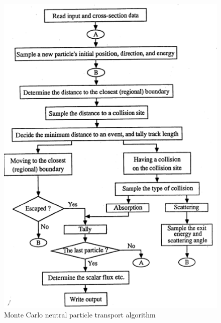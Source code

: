 \documentclass[12pt]{article}
\begin{document}
\begin{figure}[h!]
\begin{center}
  \includegraphics[height=6 in,clip]{../figs/MC-algorithm}
\end{center}
  \caption{Monte Carlo neutral particle transport algorithm}
  \label{fig:mc-algo}
\end{figure}
\end{document}
